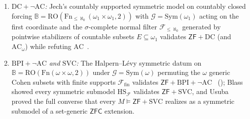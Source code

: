 \begin{theorem}
\begin{enumerate}
\begin{enumerate}
    \item \emph{$\mathrm{DC} + \neg\mathrm{AC}$:} Jech's countably supported symmetric model on countably closed forcing $\mathbb{B} = \mathrm{RO}(\mathrm{Fn}_{\le \aleph_0}(\omega_1 \times \omega_1, 2))$ with $\mathcal{G} = \mathrm{Sym}(\omega_1)$ acting on the first coordinate and the $\sigma$-complete normal filter $\mathcal{F}_{\le \aleph_0}$ generated by pointwise stabilizers of countable subsets $E \subseteq \omega_1$ validates $\mathsf{ZF} + \mathrm{DC}$ (and $\mathrm{AC}_\omega$) while refuting $\mathrm{AC}$~\cite[\S 8.1]{Jech73}.
    \item \emph{$\mathrm{BPI} + \neg\mathrm{AC}$ and $\mathrm{SVC}$:} The Halpern--L\'evy symmetric datum on $\mathbb{B} = \mathrm{RO}(\mathrm{Fn}(\omega \times \omega, 2))$ under $\mathcal{G} = \mathrm{Sym}(\omega)$ permuting the $\omega$ generic Cohen subsets with finite supports $\mathcal{F}_{\mathrm{fin}}$ validates $\mathsf{ZF} + \mathrm{BPI} + \neg\mathrm{AC}$~\cite{HalpernLevy71} (\cite[Ch.~7]{Jech73}); Blass~\cite[Theorems~4.2--4.3]{Blass79} showed every symmetric submodel $\mathrm{HS}_{\mathcal{F}}$ validates $\mathsf{ZF} + \mathrm{SVC}$, and Usuba~\cite{Usuba21} proved the full converse that every $M \models \mathsf{ZF} + \mathrm{SVC}$ realizes as a symmetric submodel of a set-generic $\mathsf{ZFC}$ extension.
  \end{enumerate}
\end{enumerate}
\end{theorem}

